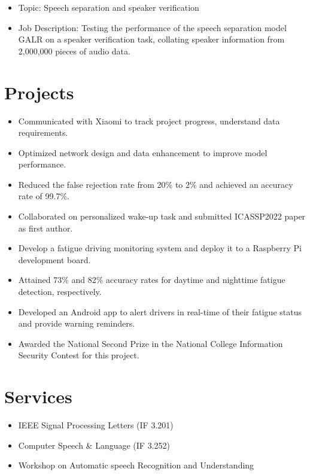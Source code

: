 \documentclass{resume}
\begin{document}
\begin{itemize}
    \item Topic: Speech separation and speaker verification
    \item Job Description: Testing the performance of the speech separation model GALR on a speaker verification task, collating
speaker information from 2,000,000 pieces of audio data.
\end{itemize}

\section{Projects}
\begin{itemize}
  \item Communicated with Xiaomi to track project progress, understand data requirements.
  \item Optimized network design and data enhancement to improve model performance.
  \item Reduced the false rejection rate from 20\% to 2\% and achieved an accuracy rate of 99.7\%.
  \item Collaborated on personalized wake-up task and submitted ICASSP2022 paper as first author.
\end{itemize}

\begin{itemize}
  \item Develop a fatigue driving monitoring system and deploy it to a Raspberry Pi development board.
  \item Attained 73\% and 82\% accuracy rates for daytime and nighttime fatigue detection, respectively.
  \item Developed an Android app to alert drivers in real-time of their fatigue status and provide warning reminders.
  \item Awarded the National Second Prize in the National College Information Security Contest for this project.
\end{itemize}

\section{Services}
\begin{itemize}
  \item IEEE Signal Processing Letters (IF 3.201)
  \item Computer Speech \& Language (IF 3.252)
  \item Workshop on Automatic speech Recognition and Understanding
\end{itemize}
\end{document}
